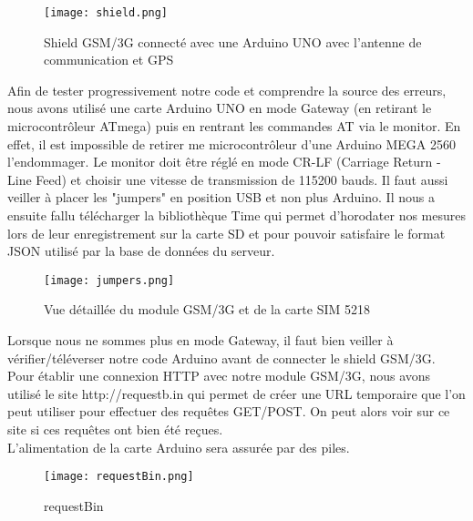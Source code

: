\begin{figure}[h!]
\centering\texttt{[image: shield.png]}
\caption{\label{fig:shield} Shield GSM/3G connecté avec une Arduino UNO avec l'antenne de communication et GPS}
\end{figure}

Afin de tester progressivement notre code et comprendre la source des erreurs, nous avons utilisé une carte Arduino UNO en mode Gateway (en retirant le microcontrôleur ATmega) puis en rentrant les commandes AT via le monitor. En effet, il est impossible de retirer me microcontrôleur d'une Arduino MEGA 2560 l'endommager. Le monitor doit être réglé en mode CR-LF (Carriage Return - Line Feed) et choisir une vitesse de transmission de 115200 bauds. Il faut aussi veiller à placer les "jumpers" en position USB et non plus Arduino. Il nous a ensuite fallu télécharger la bibliothèque Time qui permet d'horodater nos mesures lors de leur enregistrement sur la carte SD et pour pouvoir satisfaire le format JSON utilisé par la base de données du serveur.

\clearpage

\begin{figure}[h!]
\centering\texttt{[image: jumpers.png]}
\caption{\label{fig:jumpers} Vue détaillée du module GSM/3G et de la carte SIM 5218}
\end{figure}

Lorsque nous ne sommes plus en mode Gateway, il faut bien veiller à vérifier/téléverser notre code Arduino avant de connecter le shield GSM/3G. \\
Pour établir une connexion HTTP avec notre module GSM/3G, nous avons utilisé le site http://requestb.in qui permet de créer une URL temporaire que l'on peut utiliser pour effectuer des requêtes GET/POST. On peut alors voir sur ce site si ces requêtes ont bien été reçues. \\
L'alimentation de la carte Arduino sera assurée par des piles. 

\begin{figure}[h!]
\centering\texttt{[image: requestBin.png]}
\caption{\label{fig:requestBin} requestBin}
\end{figure}